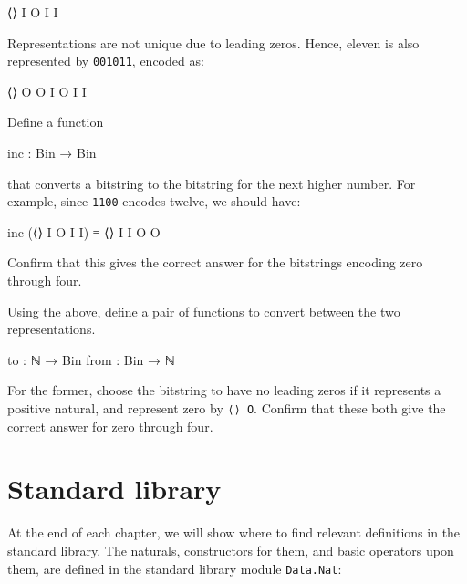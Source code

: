 \begin{myDisplay}
⟨⟩ I O I I
\end{myDisplay}

Representations are not unique due to leading zeros. Hence, eleven is
also represented by \texttt{001011}, encoded as:

\begin{myDisplay}
⟨⟩ O O I O I I
\end{myDisplay}

Define a function

\begin{myDisplay}
inc : Bin → Bin
\end{myDisplay}

that converts a bitstring to the bitstring for the next higher number.
For example, since \texttt{1100} encodes twelve, we should have:

\begin{myDisplay}
inc (⟨⟩ I O I I) ≡ ⟨⟩ I I O O
\end{myDisplay}

Confirm that this gives the correct answer for the bitstrings encoding
zero through four.

Using the above, define a pair of functions to convert between the two
representations.

\begin{myDisplay}
to   : ℕ → Bin
from : Bin → ℕ
\end{myDisplay}

For the former, choose the bitstring to have no leading zeros if it
represents a positive natural, and represent zero by \texttt{⟨⟩\ O}.
Confirm that these both give the correct answer for zero through four.

\begin{fence}
\begin{code}%
\>[0]\<%
\end{code}
\end{fence}

\hypertarget{standard-library}{%
\section{Standard library}\label{standard-library}}

At the end of each chapter, we will show where to find relevant
definitions in the standard library. The naturals, constructors for
them, and basic operators upon them, are defined in the standard library
module \texttt{Data.Nat}:

